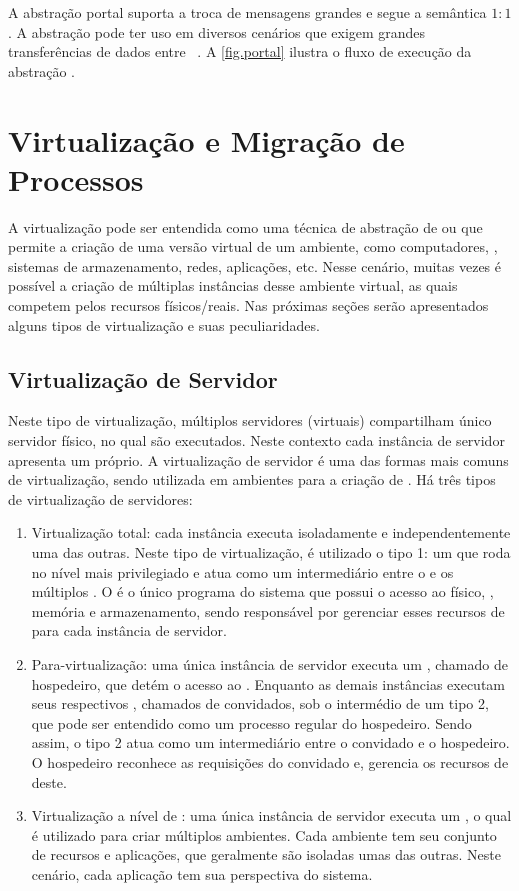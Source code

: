 A abstração portal suporta a troca de mensagens grandes e segue a semântica $1:1$. A abstração pode ter uso em diversos cenários que exigem grandes transferências de dados entre \clusters~\cite{penna:thesis}. A \autoref{fig.portal} ilustra o fluxo de execução da abstração \portal.

\section{Virtualização e Migração de Processos}
\label{sec.virtualizacao}

A virtualização pode ser entendida como uma técnica de abstração de \hardware ou \software que permite a criação de uma versão virtual de um ambiente, como computadores, \sos, sistemas de armazenamento, redes, aplicações, etc. Nesse cenário, muitas vezes é possível a criação de múltiplas instâncias desse ambiente virtual, as quais competem pelos recursos físicos/reais. Nas próximas seções serão apresentados alguns tipos de virtualização e suas peculiaridades.

\subsection{Virtualização de Servidor}
Neste tipo de virtualização, múltiplos servidores (virtuais) compartilham único servidor físico, no qual são executados. Neste contexto cada instância de servidor apresenta um \so próprio. A virtualização de servidor é uma das formas mais comuns de virtualização, sendo utilizada em ambientes \cloud para a criação de \vms. Há três tipos de virtualização de servidores:
\begin{enumerate}[label=(\roman*)]
    \item Virtualização total: cada instância executa isoladamente e independentemente uma das outras. Neste tipo de virtualização, é utilizado o \hypervisor tipo 1: um \software que roda no nível mais privilegiado e atua como um intermediário entre o \hardware e os múltiplos \sos. O \hypervisor é o único programa do sistema que possui o acesso ao \hardware físico, \eg \cpu, memória e armazenamento, sendo responsável por gerenciar esses recursos de \hardware para cada instância de servidor.
    \item Para-virtualização: uma única instância de servidor executa um \so, chamado de \so hospedeiro, que detém o acesso ao \hardware. Enquanto as demais instâncias executam seus respectivos \sos, chamados de \sos convidados, sob o intermédio de um \hypervisor tipo 2, que pode ser entendido como um processo regular do \so hospedeiro. Sendo assim, o \hypervisor tipo 2 atua como um intermediário entre o \so convidado e o \so hospedeiro. O \so hospedeiro reconhece as requisições do \so convidado e, gerencia os recursos de \hardware deste.
    \item Virtualização a nível de \so: uma única instância de servidor executa um \so, o qual é utilizado para criar múltiplos ambientes. Cada ambiente tem seu conjunto de recursos e aplicações, que geralmente são isoladas umas das outras. Neste cenário, cada aplicação tem sua perspectiva do sistema.
\end{enumerate}

